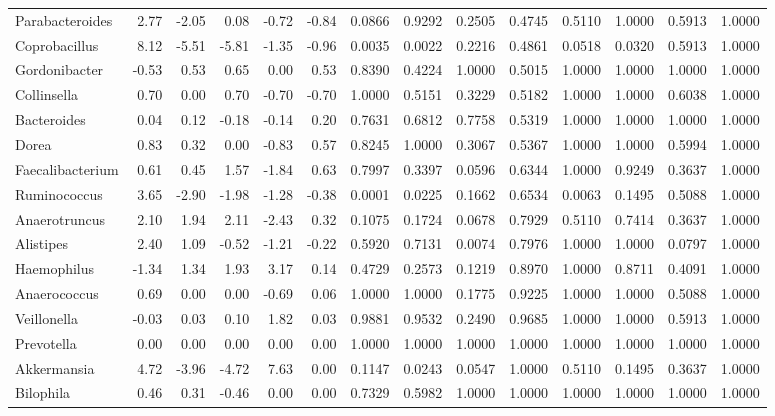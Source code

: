 {\begin{landscape}
\begin{longtable}{ | l | r | r | r | r | r | r  | r | r | r | r | r | r  | r  |}
		Parabacteroides & 2.77 & -2.05 & 0.08 & -0.72 & -0.84 & 0.0866 & 0.9292 & 0.2505 & 0.4745 & 0.5110 & 1.0000 & 0.5913 & 1.0000 \\ 
		Coprobacillus & 8.12 & -5.51 & -5.81 & -1.35 & -0.96 & 0.0035 & 0.0022 & 0.2216 & 0.4861 & 0.0518 & 0.0320 & 0.5913 & 1.0000 \\ 
		Gordonibacter & -0.53 & 0.53 & 0.65 & 0.00 & 0.53 & 0.8390 & 0.4224 & 1.0000 & 0.5015 & 1.0000 & 1.0000 & 1.0000 & 1.0000 \\ 
		Collinsella & 0.70 & 0.00 & 0.70 & -0.70 & -0.70 & 1.0000 & 0.5151 & 0.3229 & 0.5182 & 1.0000 & 1.0000 & 0.6038 & 1.0000 \\ 
		Bacteroides & 0.04 & 0.12 & -0.18 & -0.14 & 0.20 & 0.7631 & 0.6812 & 0.7758 & 0.5319 & 1.0000 & 1.0000 & 1.0000 & 1.0000 \\ 
		Dorea & 0.83 & 0.32 & 0.00 & -0.83 & 0.57 & 0.8245 & 1.0000 & 0.3067 & 0.5367 & 1.0000 & 1.0000 & 0.5994 & 1.0000 \\ 
		Faecalibacterium & 0.61 & 0.45 & 1.57 & -1.84 & 0.63 & 0.7997 & 0.3397 & 0.0596 & 0.6344 & 1.0000 & 0.9249 & 0.3637 & 1.0000 \\ 
		Ruminococcus & 3.65 & -2.90 & -1.98 & -1.28 & -0.38 & 0.0001 & 0.0225 & 0.1662 & 0.6534 & 0.0063 & 0.1495 & 0.5088 & 1.0000 \\ 
		Anaerotruncus & 2.10 & 1.94 & 2.11 & -2.43 & 0.32 & 0.1075 & 0.1724 & 0.0678 & 0.7929 & 0.5110 & 0.7414 & 0.3637 & 1.0000 \\ 
		Alistipes & 2.40 & 1.09 & -0.52 & -1.21 & -0.22 & 0.5920 & 0.7131 & 0.0074 & 0.7976 & 1.0000 & 1.0000 & 0.0797 & 1.0000 \\ 
		Haemophilus & -1.34 & 1.34 & 1.93 & 3.17 & 0.14 & 0.4729 & 0.2573 & 0.1219 & 0.8970 & 1.0000 & 0.8711 & 0.4091 & 1.0000 \\ 
		Anaerococcus & 0.69 & 0.00 & 0.00 & -0.69 & 0.06 & 1.0000 & 1.0000 & 0.1775 & 0.9225 & 1.0000 & 1.0000 & 0.5088 & 1.0000 \\ 
		Veillonella & -0.03 & 0.03 & 0.10 & 1.82 & 0.03 & 0.9881 & 0.9532 & 0.2490 & 0.9685 & 1.0000 & 1.0000 & 0.5913 & 1.0000 \\ 
		Prevotella & 0.00 & 0.00 & 0.00 & 0.00 & 0.00 & 1.0000 & 1.0000 & 1.0000 & 1.0000 & 1.0000 & 1.0000 & 1.0000 & 1.0000 \\ 
		Akkermansia & 4.72 & -3.96 & -4.72 & 7.63 & 0.00 & 0.1147 & 0.0243 & 0.0547 & 1.0000 & 0.5110 & 0.1495 & 0.3637 & 1.0000 \\ 
		Bilophila & 0.46 & 0.31 & -0.46 & 0.00 & 0.00 & 0.7329 & 0.5982 & 1.0000 & 1.0000 & 1.0000 & 1.0000 & 1.0000 & 1.0000 \\ 

\end{longtable}
\end{landscape}}
